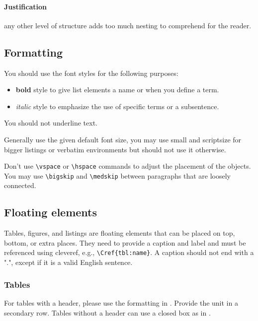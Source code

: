 \documentclass{jhps}
\begin{document}
\paragraph{Justification} any other level of structure adds too much nesting to comprehend for the reader.

\subsection{Formatting}
You should use the font styles for the following purposes:
\begin{itemize}
  \item \textbf{bold} style to give list elements a name or when you define a term.
  \item \textit{italic} style to emphasize the use of specific terms or a subsentence.
\end{itemize}
You should not underline text.

\medskip

Generally use the given default font size, you may use small and scriptsize for bigger listings or verbatim environments but should not use it otherwise.

\medskip

Don't use \verb|\vspace| or \verb|\hspace| commands to adjust the placement of the objects.
You may use \verb|\bigskip| and \verb|\medskip| between paragraphs that are loosely connected.

\subsection{Floating elements}
Tables, figures, and listings are floating elements that can be placed on top, bottom, or extra places.
They need to provide a caption and label and must be referenced using cleveref, e.g., \verb|\Cref{tbl:name}|.
A caption should not end with a ".", except if it is a valid English sentence.

\subsubsection{Tables}

For tables with a header, please use the formatting in .
Provide the unit in a secondary row.
Tables without a header can use a closed box as in .
\end{document}
